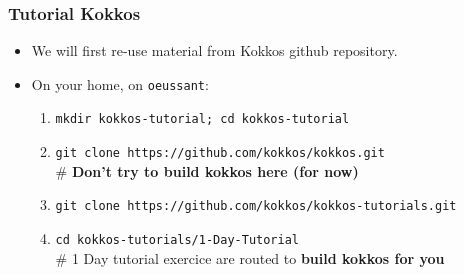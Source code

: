 \begin{frame}
  \frametitle{Tutorial Kokkos}

  \begin{itemize}
  \item We will first re-use material from Kokkos github repository.
  \item On your home, on \texttt{oeussant}: 
    \begin{enumerate}
    \item \texttt{mkdir kokkos-tutorial; cd kokkos-tutorial}
    \item \texttt{git clone https://github.com/kokkos/kokkos.git} \\
      \# \textbf{Don't try to build kokkos here (for now)}
    \item \texttt{git clone https://github.com/kokkos/kokkos-tutorials.git}
    \item \texttt{cd kokkos-tutorials/1-Day-Tutorial}\\
      \# 1 Day tutorial exercice are routed to \textbf{build kokkos for you}
    \end{enumerate}
  \end{itemize}

\end{frame}

